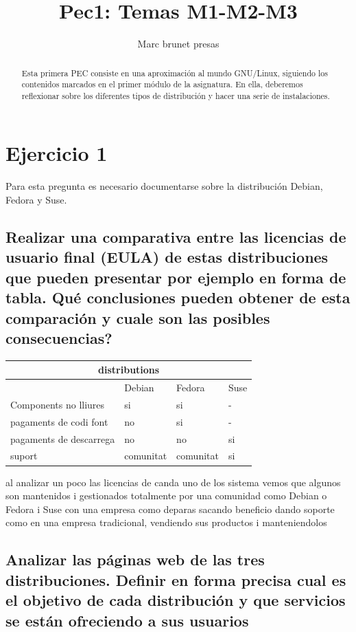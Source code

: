 \documentclass[preprint,11pt]{elsarticle}
\begin{document}
\begin{frontmatter}

    \title{Pec1: Temas M1-M2-M3}
    \author{Marc brunet presas}
    \address{Manresa, Barcelona,}
    \begin{abstract}
    Esta primera PEC consiste en una aproximación al mundo GNU/Linux, siguiendo los contenidos marcados en el primer módulo de la asignatura. En ella, deberemos reflexionar sobre los diferentes tipos de distribución y hacer una serie de instalaciones.
    \end{abstract}
\end{frontmatter}


\section{Ejercicio 1}
\label{S:1}
Para esta pregunta es necesario documentarse sobre la distribución Debian, Fedora y Suse.
\subsection{Realizar una comparativa entre las licencias de usuario final (EULA) de estas distribuciones que pueden presentar por ejemplo en forma de tabla. Qué conclusiones pueden obtener de esta comparación y cuale son las posibles consecuencias?}

\begin{tabular}{ |p{5cm}||p{2cm}|p{2cm}|p{2cm}|  }
 \hline
 \multicolumn{4}{|c|}{distributions} \\
 \hline
  &Debian &Fedora &Suse\\
 \hline
Components no lliures &si &si &-\\
pagaments de codi font &no &si &-\\
pagaments de descarrega &no &no &si\\
suport &comunitat &comunitat &si \\
 \hline
\end{tabular}
\bigskip 

al analizar un poco las licencias de canda uno de los sistema vemos que algunos son mantenidos i gestionados totalmente por una comunidad como Debian o Fedora i Suse con una empresa como deparas sacando beneficio dando soporte como en una empresa tradicional, vendiendo sus productos i manteniendolos 


\newpage
\subsection{Analizar las páginas web de las tres distribuciones. Definir en forma precisa cual es el objetivo de cada distribución y que servicios se están ofreciendo a sus usuarios}
\label{S:2}
\end{document}
